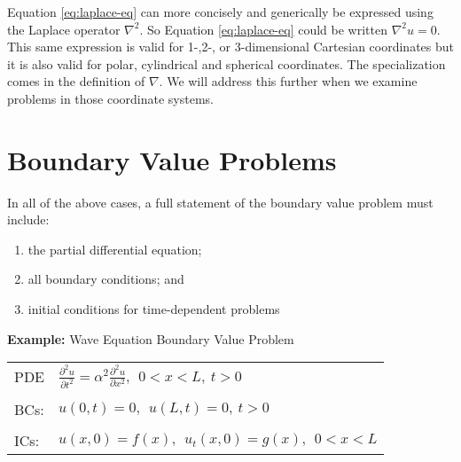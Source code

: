 Equation \ref{eq:laplace-eq} can more concisely and generically be expressed using the Laplace operator $\nabla^2$.
So Equation \ref{eq:laplace-eq} could be written $\nabla^2 u = 0$.  This same expression is valid for 1-,2-, or 3-dimensional Cartesian coordinates but it is also valid for polar, cylindrical and spherical coordinates.  The specialization comes in the definition of $\nabla$.  We will address this further when we examine problems in those coordinate systems.

\section{Boundary Value Problems}
In all of the above cases, a full statement of the boundary value problem must include:
\begin{enumerate}
\item the partial differential equation;
\item all boundary conditions; and
\item initial conditions for time-dependent problems
\end{enumerate}

\vspace{0.5cm}

\noindent\textbf{Example:} Wave Equation Boundary Value Problem
\begin{table}
\begin{tabular}{l l}
PDE & $ \frac{\partial^2 u}{\partial t^2} = \alpha^2 \frac{\partial^2 u}{\partial x^2}, \ \ 0<x<L, \ t>0$\\
 & \\
BCs: & $u(0,t) = 0, \ \ u(L,t) = 0, \ t>0$ \\
 & \\
ICs: & $u(x,0)=f(x), \ \ u_t(x,0)=g(x), \ \ 0<x<L$ \\
\end{tabular}
\end{table}

